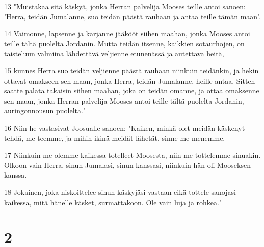 \par 13 "Muistakaa sitä käskyä, jonka Herran palvelija Mooses teille antoi sanoen: 'Herra, teidän Jumalanne, suo teidän päästä rauhaan ja antaa teille tämän maan'.
\par 14 Vaimonne, lapsenne ja karjanne jääkööt siihen maahan, jonka Mooses antoi teille tältä puolelta Jordanin. Mutta teidän itsenne, kaikkien sotaurhojen, on taisteluun valmiina lähdettävä veljienne etunenässä ja autettava heitä,
\par 15 kunnes Herra suo teidän veljienne päästä rauhaan niinkuin teidänkin, ja hekin ottavat omakseen sen maan, jonka Herra, teidän Jumalanne, heille antaa. Sitten saatte palata takaisin siihen maahan, joka on teidän omanne, ja ottaa omaksenne sen maan, jonka Herran palvelija Mooses antoi teille tältä puolelta Jordanin, auringonnousun puolelta."
\par 16 Niin he vastasivat Joosualle sanoen: "Kaiken, minkä olet meidän käskenyt tehdä, me teemme, ja mihin ikinä meidät lähetät, sinne me menemme.
\par 17 Niinkuin me olemme kaikessa totelleet Moosesta, niin me tottelemme sinuakin. Olkoon vain Herra, sinun Jumalasi, sinun kanssasi, niinkuin hän oli Mooseksen kanssa.
\par 18 Jokainen, joka niskoittelee sinun käskyjäsi vastaan eikä tottele sanojasi kaikessa, mitä hänelle käsket, surmattakoon. Ole vain luja ja rohkea."

\chapter{2}

